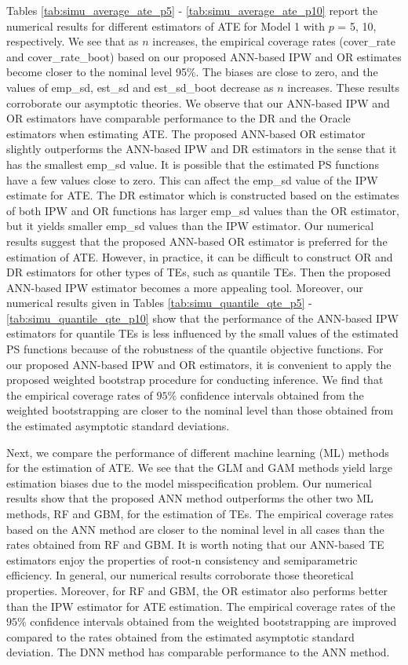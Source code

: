 \documentclass[11pt]{article}
\numberwithin{equation}{section}
\begin{document}
Tables \ref{tab:simu_average_ate_p5} -  \ref{tab:simu_average_ate_p10} report the numerical results for different estimators of ATE for Model 1 with $p$ = 5, 10,  respectively. We see that
as $n$ increases, the empirical coverage rates (cover\_rate and cover\_rate\_boot) based on our proposed ANN-based IPW and OR estimates become closer to the nominal level 95\%. The biases are close to zero, and the values of emp\_sd, est\_sd and est\_sd\_boot decrease as $n$ increases. These results corroborate our asymptotic theories.  We observe that our ANN-based IPW and OR estimators have comparable performance to the DR and the Oracle estimators when estimating ATE. The proposed ANN-based OR estimator slightly outperforms the ANN-based IPW and DR estimators in the sense that it has the smallest emp\_sd value. It is possible that the estimated PS functions have a few values close to zero. This can affect the emp\_sd value of the IPW estimate for ATE. The DR estimator which is constructed based on the estimates of both IPW and OR functions has larger emp\_sd values than the OR estimator, but it yields smaller emp\_sd values than the IPW estimator. Our numerical results suggest that the proposed ANN-based OR estimator is preferred for the estimation of ATE. However, in practice, it can be difficult to construct OR and DR estimators for other types of TEs, such as quantile TEs. Then the proposed ANN-based IPW estimator becomes a more appealing tool. Moreover, our numerical results given in Tables \ref{tab:simu_quantile_qte_p5} -  \ref{tab:simu_quantile_qte_p10} show that the performance of the ANN-based IPW estimators for quantile TEs is less influenced by the small values of the estimated PS functions because of the robustness of the quantile objective functions. For our proposed ANN-based IPW and OR estimators, it is convenient to apply the proposed weighted bootstrap procedure for conducting inference. We find that the empirical coverage rates of $95\%$ confidence intervals obtained from the weighted bootstrapping are closer to the nominal level than those obtained from the estimated asymptotic standard deviations.

Next, we compare the performance of different machine learning (ML) methods for the estimation of ATE. We see that the GLM and GAM methods yield large estimation biases due to the model misspecification problem. Our numerical results show that the proposed ANN method outperforms the other two ML methods, RF and GBM, for the estimation of TEs. The empirical coverage rates based on the ANN method are closer to the nominal level in all cases than the rates obtained from RF and GBM. It is worth noting that our ANN-based TE estimators enjoy the properties of root-n consistency and semiparametric efficiency. In general, our numerical results corroborate those theoretical properties.  Moreover, for RF and GBM, the OR estimator also performs better than the IPW estimator for ATE estimation. The empirical coverage rates of the $95\%$ confidence intervals obtained from the weighted bootstrapping are improved compared to the rates obtained from the estimated asymptotic standard deviation. The DNN method has comparable performance to the ANN method.
\end{document}
